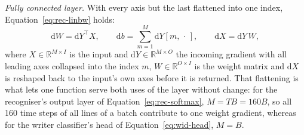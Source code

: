 \emph{Fully connected layer.} With every axis but the last flattened into one index, Equation~\ref{eq:rec-linbw} holds:
\begin{equation}
\mathrm dW=\mathrm dY^{\top}X,\qquad \mathrm db=\sum_{m=1}^{M}\mathrm dY[m,\,\cdot\,],\qquad \mathrm dX=\mathrm dY\,W,
\label{eq:rec-linbw}
\end{equation}
where $X\in\mathbb R^{M\times I}$ is the input and $\mathrm dY\in\mathbb R^{M\times O}$ the incoming gradient with all leading axes collapsed into the index $m$, $W\in\mathbb R^{O\times I}$ is the weight matrix and $\mathrm dX$ is reshaped back to the input's own axes before it is returned.
That flattening is what lets one function serve both uses of the layer without change: for the recogniser's output layer of Equation~\ref{eq:rec-softmax}, $M=TB=160B$, so all 160 time steps of all lines of a batch contribute to one weight gradient, whereas for the writer classifier's head of Equation~\ref{eq:wid-head}, $M=B$.

